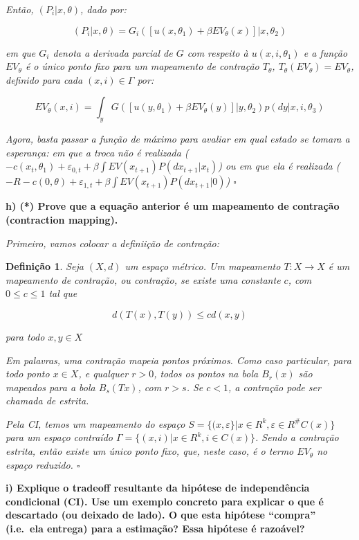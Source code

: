 \documentclass[12pt,a4paper]{article}
\newtheorem{definition}{Definição}
\begin{document}
\emph{Então, \((P_i|x,\theta)\), dado por:}

\[
(P_i|x,\theta) = G_i([u(x,\theta_1)+ \beta EV_\theta(x)]|x,\theta_2)
\]

\emph{em que \(G_i\) denota a derivada parcial de \(G\) com respeito à
\(u(x,i,\theta_1)\) e a função \(EV_\theta\) é o único ponto fixo para
um mapeamento de contração \(T_\theta\),
\(T_\theta(EV_\theta)=EV_\theta\), definido para cada
\((x,i) \in \Gamma\) por:}

\[
EV_\theta(x,i)=\int_yG([u(y,\theta_1)+\beta EV_\theta (y)]|y,\theta_2)p(dy|x,i,\theta_3)
\]

\emph{Agora, basta passar a função de máximo para avaliar em qual estado
se tomara a esperança: em que a troca não é realizada
(\(-c(x_t,\theta_1)+\varepsilon_{0,t} + \beta \int EV(x_{t+1})P(dx_{t+1}|x_t)\))
ou em que ela é realizada
(\(-R -c(0,\theta) + \varepsilon_{1,t} + \beta \int EV(x_{t+1})P(dx_{t+1}|0)\))
\(\square\)}

\textbf{h) (*) Prove que a equação anterior é um mapeamento de contração
(contraction mapping).}

\emph{Primeiro, vamos colocar a definiição de contração:}

\begin{definition}
Seja $(X,d)$ um espaço métrico. Um mapeamento $T:X \rightarrow X$ é um mapeamento de contração, ou contração, se existe uma constante $c$, com $0 \leq c \leq 1$ tal que  

\[
d(T(x),T(y)) \leq cd(x,y)
\]

para todo $x,y \in X$

\end{definition}

\emph{Em palavras, uma contração mapeia pontos próximos. Como caso
particular, para todo ponto \(x \in X\), e qualquer \(r>0\), todos os
pontos na bola \(B_r(x)\) são mapeados para a bola \(B_s(Tx)\), com
\(r > s\). Se \(c < 1\), a contração pode ser chamada de estrita.}

\emph{Pela CI, temos um mapeamento do espaço
\(S=\{(x,\varepsilon\}|x \in R^k, \varepsilon \in R^\#C(x)\}\) para um
espaço contraído \(\Gamma=\{(x,i)|x \in R^k, i \in C(x)\}\). Sendo a
contração estrita, então existe um único ponto fixo, que, neste caso, é
o termo \(EV_\theta\) no espaço reduzido. \(\square\)}

\textbf{i) Explique o tradeoff resultante da hipótese de independência
condicional (CI). Use um exemplo concreto para explicar o que é
descartado (ou deixado de lado). O que esta hipótese ``compra''
(i.e.~ela entrega) para a estimação? Essa hipótese é razoável?}
\end{document}
